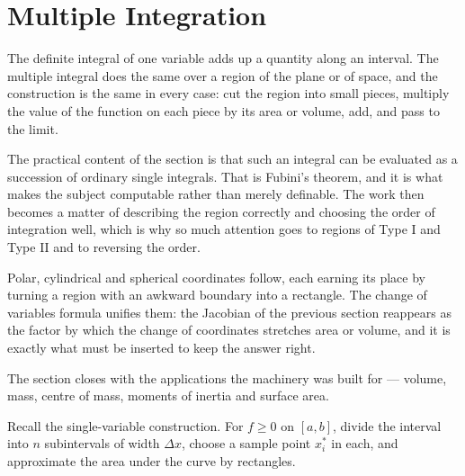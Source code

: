 \documentclass[11pt,a4paper]{article}
\theoremstyle{definition}
\begin{document}
\section{Multiple Integration}

The definite integral of one variable adds up a quantity along an interval. The
multiple integral does the same over a region of the plane or of space, and the
construction is the same in every case: cut the region into small pieces,
multiply the value of the function on each piece by its area or volume, add, and
pass to the limit.

The practical content of the section is that such an integral can be evaluated
as a succession of ordinary single integrals. That is Fubini's theorem, and it
is what makes the subject computable rather than merely definable. The work then
becomes a matter of describing the region correctly and choosing the order of
integration well, which is why so much attention goes to regions of Type I and
Type II and to reversing the order.

Polar, cylindrical and spherical coordinates follow, each earning its place by
turning a region with an awkward boundary into a rectangle. The change of
variables formula unifies them: the Jacobian of the previous section reappears
as the factor by which the change of coordinates stretches area or volume, and
it is exactly what must be inserted to keep the answer right.

The section closes with the applications the machinery was built for --- volume,
mass, centre of mass, moments of inertia and surface area.

Recall the single-variable construction. For $f\geq 0$ on $[a,b]$, divide the
interval into $n$ subintervals of width $\Delta x$, choose a sample point
$x_i^*$ in each, and approximate the area under the curve by rectangles.

\begin{figure}[H]
\centering
{}
\end{figure}
\end{document}
